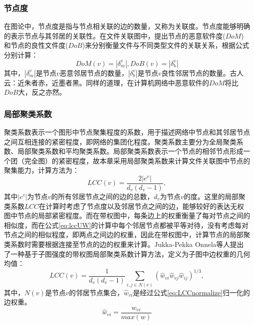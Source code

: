 \subsubsection{节点度}
在图论中，节点度是指与节点相关联的边的数量，又称为关联度。节点度能够明确的表示节点与其邻居的关联性\cite{diestel2010graph}。在文件关联图中，提出节点的恶意软件度($DoM$)和节点的良性文件度($DoB$)来分别衡量文件与不同类型文件的关联关系，根据公式分别计算：
\begin{equation}
\label{eq:domAnddob}
DoM(v)=\left | \delta_{m}^{v}  \right |, DoB(v)=\left | \delta_{b}^{v}  \right |
\end{equation}
其中，$\left | \delta_{m}^{v}  \right |$是节点$v$恶意邻居节点的数量，$\left | \delta_{b}^{v}  \right |$是节点$v$良性邻居节点的数量。古人云：近朱者赤，近墨者黑。同样的道理，在计算机网络中恶意软件的$DoM$将比$DoB$大，反之亦然。

\subsubsection{局部聚类系数}
聚类系数表示一个图形中节点聚集程度的系数，用于描述网络中节点和其邻居节点之间互相连接的紧密程度，即网络的集团化程度。聚类系数主要分为全局聚类系数、局部聚类系数和平均聚类系数。局部聚类系数表示一个节点的相邻节点形成一个团（完全图）的紧密程度，故本章采用局部聚类系数来计算文件关联图中节点的聚集能力，计算方法为\cite{watts1998collective}：
\begin{equation}
\label{eq:lccUW}
LCC(v)=\frac{2\left | e^{v} \right |}{d_{v}(d_{v}-1)},
\end{equation}
其中$\left | e^{v} \right |$为节点$v$的所有邻居节点之间的边的总数，$d_{v}$为节点$v$的度。这里的局部聚类系数$LCC$在计算时考虑了节点度以及邻居节点之间的边，能够较好的表达无权图中节点的局部紧密程度。而在带权图中，每条边上的权重衡量了每对节点之间的相似度，而在公式\ref{eq:lccUW}的计算中每个邻居节点都被平等对待，没有考虑每对节点之间的相似程度，即两点之间边的权重，因此在带权图中，计算节点的局部聚类系数时需要根据连接至节点的边的权重来计算。Jukka-Pekka Onnela等人\cite{onnela2005intensity}提出了一种基于子图强度的带权图局部聚类系数计算方法，定义为子图中边权重的几何均值：
\begin{equation}
LCC(v)=\frac{1}{d_{v}(d_{v}-1)}\sum_{i,j \in N(v)}(\hat{w}_{vi}\hat{w}_{vj}\hat{w}_{ij})^{1/3},
\end{equation}
其中，$N(v)$是节点$v$的邻居节点集合，$\hat{w}_{vi}$是经过公式\ref{eq:LCCnormalize}归一化的边权重。
\begin{equation}
\label{eq:LCCnormalize}
\hat{w}_{vi} = \frac{w_{vi}} {max(w)}
\end{equation}


